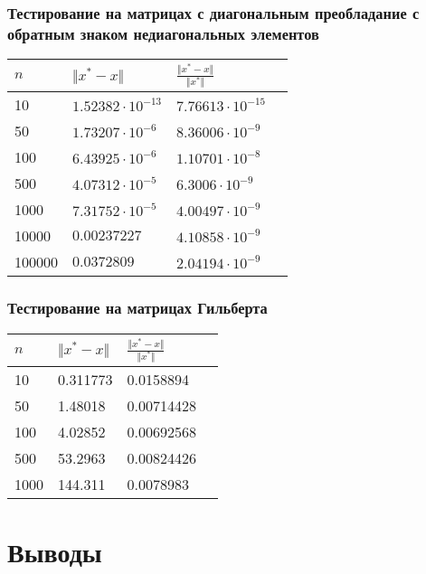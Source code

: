 \documentclass[english]{article}
\begin{document}
\subsubsection{Тестирование на матрицах с диагональным преобладание с обратным знаком недиагональных элементов}
\begin{center}
  \begin{longtable}{l|l|l|l}
    \(n\) & \(\Vert x^* - x \Vert\) & \(\frac{\Vert x^* - x \Vert}{\Vert x^* \Vert}\) \\
    \hline
    10 & \(1.52382\cdot 10^{-13}\) & \(7.76613\cdot 10^{-15}\) \\
    50 & \(1.73207\cdot 10^{-6}\) & \(8.36006\cdot 10^{-9}\) \\
    100 & \(6.43925\cdot 10^{-6}\) & \(1.10701\cdot 10^{-8}\) \\
    500 & \(4.07312\cdot 10^{-5}\) & \(6.3006\cdot 10^{-9}\) \\
    1000 & \(7.31752\cdot 10^{-5}\) & \(4.00497\cdot 10^{-9}\) \\
    10000 & \(0.00237227\) & \(4.10858\cdot 10^{-9}\) \\
    100000 & \(0.0372809\) & \(2.04194\cdot 10^{-9}\)
  \end{longtable}
\end{center}
\subsubsection{Тестирование на матрицах Гильберта}
\begin{center}
  \begin{longtable}{l|l|l|l}
    \(n\) & \(\Vert x^* - x \Vert\) & \(\frac{\Vert x^* - x \Vert}{\Vert x^* \Vert}\) \\
    \hline
    10 & 0.311773 & 0.0158894 \\
    50 & 1.48018 & 0.00714428 \\
    100 & 4.02852 & 0.00692568 \\
    500 & 53.2963 & 0.00824426 \\
    1000 & 144.311 & 0.0078983
  \end{longtable}
\end{center}
\section{Выводы}
\end{document}
